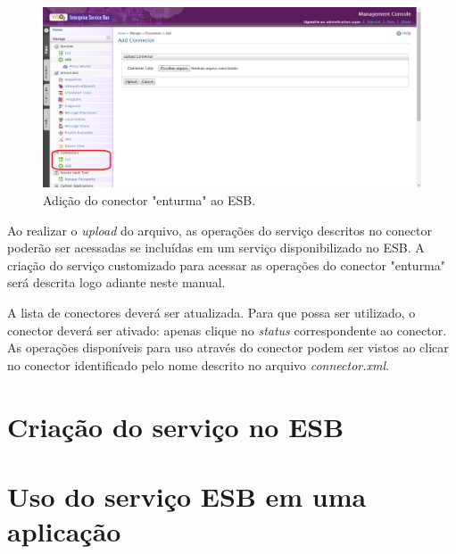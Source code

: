 \begin{figure}[htb]
\centering
\includegraphics[width=1.0\textwidth]{figuras/add_connector.PNG}
\caption{Adição do conector "enturma" ao ESB.}
\label{add_connector}
\end{figure}

Ao realizar o \textit{upload} do arquivo, as operações do serviço descritos no conector poderão ser acessadas se incluídas em um serviço disponibilizado no ESB. A criação do serviço customizado para acessar as operações do conector "enturma" será descrita logo adiante neste manual.

A lista de conectores deverá ser atualizada. Para que possa ser utilizado, o conector deverá ser ativado: apenas clique no \textit{status} correspondente ao conector. As operações disponíveis para uso através do conector podem ser vistos ao clicar no conector identificado pelo nome descrito no arquivo \textit{connector.xml}.

\section{Criação do serviço no ESB}


\section{Uso do serviço ESB em uma aplicação}


